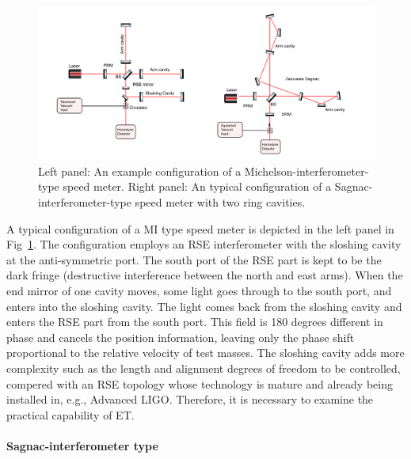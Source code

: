 \begin{figure}
\centering
\includegraphics[scale =0.5]{./Sec_Optics/sec5-10-MISM.pdf}
\caption{Left panel: An example configuration of a Michelson-interferometer-type speed meter.
Right panel: An typical configuration of a Sagnac-interferometer-type speed meter
with two ring cavities.}
\label{fig:tech-MISM}
\end{figure}
A typical configuration of a MI type speed meter \cite{Purdue2002, Purdue2002a}
is depicted in the left panel in Fig~\ref{fig:tech-MISM}.
The configuration employs an RSE interferometer with the sloshing cavity at the anti-symmetric port.
The south port of the RSE part is kept to be the dark fringe
(destructive interference between the north and east arms).
When the end mirror of one cavity moves, some light goes through to
the south port, and enters into the sloshing cavity.
The light comes back from the sloshing cavity
and enters the RSE part from the south port. This field is 180 degrees different in phase
and cancels the position information, leaving only the phase shift proportional
to the relative velocity of test masses.
The sloshing cavity adds more complexity such as
the length and alignment degrees of freedom to be controlled,
compered with an RSE topology whose technology is mature and already being installed
in, e.g., Advanced LIGO. Therefore, it is necessary to examine the practical capability of ET.




\paragraph{Sagnac-interferometer type}

